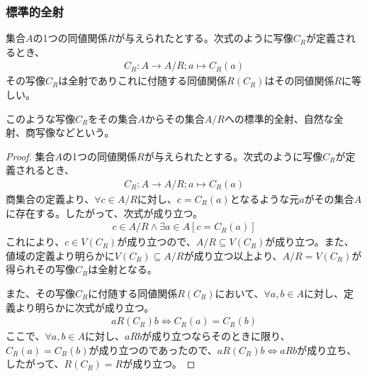 \documentclass[dvipdfmx]{jsarticle}
\begin{document}
\subsubsection{標準的全射}%
\begin{thm}\label{1.2.5.12}
集合$A$の1つの同値関係$R$が与えられたとする。次式のように写像$C_{R}$が定義されるとき、
\begin{align*}
C_{R}:A \rightarrow A/R;a \mapsto C_{R}(a)
\end{align*}
その写像$C_{R}$は全射でありこれに付随する同値関係$R\left( C_{R} \right)$はその同値関係$R$に等しい。
\end{thm}
\begin{dfn}
このような写像$C_{R}$をその集合$A$からその集合$A/R$への標準的全射、自然な全射、商写像などという。
\end{dfn}
\begin{proof}
集合$A$の1つの同値関係$R$が与えられたとする。次式のように写像$C_{R}$が定義されるとき、
\begin{align*}
C_{R}:A \rightarrow A/R;a \mapsto C_{R}(a)
\end{align*}
商集合の定義より、$\forall c \in A/R$に対し、$c = C_{R}(a)$となるような元$a$がその集合$A$に存在する。したがって、次式が成り立つ。
\begin{align*}
c \in A/R \land \exists a \in A\left[ c = C_{R}(a) \right]
\end{align*}
これにより、$c \in V\left( C_{R} \right)$が成り立つので、$A/R \subseteq V\left( C_{R} \right)$が成り立つ。また、値域の定義より明らかに$V\left( C_{R} \right) \subseteq A/R$が成り立つ以上より、$A/R = V\left( C_{R} \right)$が得られその写像$C_{R}$は全射となる。\par
また、その写像$C_{R}$に付随する同値関係$R\left( C_{R} \right)$において、$\forall a,b \in A$に対し、定義より明らかに次式が成り立つ。
\begin{align*}
aR\left( C_{R} \right)b \Leftrightarrow C_{R}(a) = C_{R}(b)
\end{align*}
ここで、$\forall a,b \in A$に対し、$aRb$が成り立つならそのときに限り、$C_{R}(a) = C_{R}(b)$が成り立つのであったので、$aR\left( C_{R} \right)b \Leftrightarrow aRb$が成り立ち、したがって、$R\left( C_{R} \right) = R$が成り立つ。
\end{proof}
\end{document}
